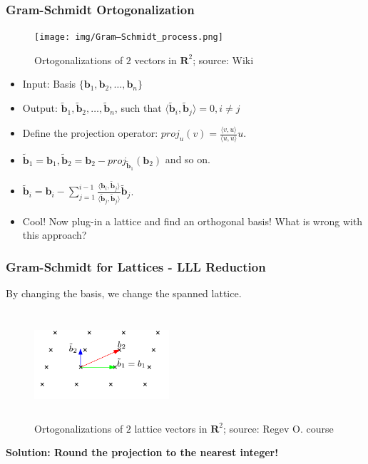 \documentclass{beamer}
\begin{document}
\begin{frame}
    \frametitle{Gram-Schmidt Ortogonalization}
        \begin{figure}
            \texttt{[image: img/Gram–Schmidt\_process.png]}
            \caption{Ortogonalizations of $2$ vectors in $\mathbf{R}^2$; source: Wiki}
        \end{figure}

    \begin{itemize}
        \item Input: Basis $\{ \mathbf{b}_1, \mathbf{b}_2, \dots , \mathbf{b}_n \} $
        \pause \item Output: $\tilde{\mathbf{b}}_1, \tilde{\mathbf{b}}_2, \dots, \tilde{\mathbf{b}}_n$, such that $ \langle \tilde{\mathbf{b}}_i, \tilde{\mathbf{b}}_j \rangle = 0, i \neq j$ 
        \pause \item Define the projection operator: $proj_{u}(v) = \frac{\langle v, u \rangle}{\langle u, u \rangle}u$.
        \pause \item $\tilde{\mathbf{b}}_1 = \mathbf{b}_1, \tilde{\mathbf{b}}_2 = \mathbf{b}_2 - proj_{\tilde{\mathbf{b}}_1}({\mathbf{b}}_2)$ and so on.
        \pause \item $\tilde{\mathbf{b}}_i = \mathbf{b}_i - \sum_{j=1}^{i-1}{\frac{\langle \mathbf{b}_i, \tilde{\mathbf{b}}_j \rangle}{\langle \tilde{\mathbf{b}}_j, \tilde{\mathbf{b}}_j \rangle} \tilde{\mathbf{b}}_j}$.
        \pause \item Cool! Now plug-in a lattice and find an orthogonal basis! \pause What is wrong with this approach?
    \end{itemize}
\end{frame}

\begin{frame}
    \frametitle{Gram-Schmidt for Lattices - LLL Reduction}
    By changing the basis, we change the spanned lattice.
    \begin{figure}
            \includegraphics[width=5cm,height=4cm,keepaspectratio]{img/gram-schmidt.png}
            \caption{Ortogonalizations of $2$ lattice vectors in $\mathbf{R}^2$; source: Regev O. course}
        \end{figure}

    \pause \textbf{Solution: Round the projection to the nearest integer!}
\end{frame}
\end{document}
